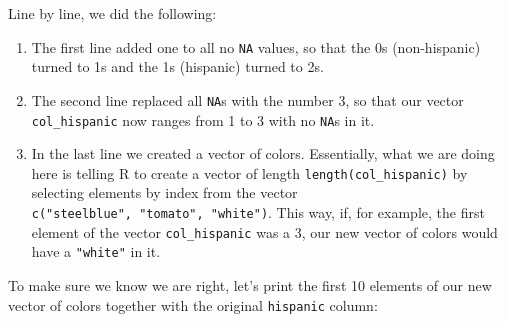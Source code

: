 \documentclass[
]{book}
\newenvironment{Shaded}{\begin{snugshade}}{\end{snugshade}}
\newcommand{\AttributeTok}[1]{\textcolor[rgb]{0.77,0.63,0.00}{#1}}
\newcommand{\DecValTok}[1]{\textcolor[rgb]{0.00,0.00,0.81}{#1}}
\newcommand{\FunctionTok}[1]{\textcolor[rgb]{0.00,0.00,0.00}{#1}}
\newcommand{\NormalTok}[1]{#1}
\newcommand{\OtherTok}[1]{\textcolor[rgb]{0.56,0.35,0.01}{#1}}
\newcommand{\SpecialCharTok}[1]{\textcolor[rgb]{0.00,0.00,0.00}{#1}}
\newcommand{\StringTok}[1]{\textcolor[rgb]{0.31,0.60,0.02}{#1}}
\begin{document}
\begin{Shaded}
\end{Shaded}

Line by line, we did the following:

\begin{enumerate}
\def\labelenumi{\arabic{enumi}.}
\item
  The first line added one to all no \texttt{NA} values, so that the 0s (non-hispanic) turned to 1s and the 1s (hispanic) turned to 2s.
\item
  The second line replaced all \texttt{NA}s with the number 3, so that our vector \texttt{col\_hispanic} now ranges from 1 to 3 with no \texttt{NA}s in it.
\item
  In the last line we created a vector of colors. Essentially, what we are doing here is telling R to create a vector of length \texttt{length(col\_hispanic)} by selecting elements by index from the vector \texttt{c("steelblue",\ "tomato",\ "white")}. This way, if, for example, the first element of the vector \texttt{col\_hispanic} was a 3, our new vector of colors would have a \texttt{"white"} in it.
\end{enumerate}

To make sure we know we are right, let's print the first 10 elements of our new vector of colors together with the original \texttt{hispanic} column:

\begin{Shaded}
\end{Shaded}
\end{document}
